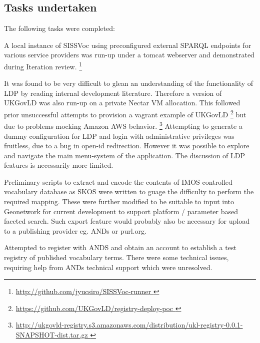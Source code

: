 \documentclass[10pt,a4paper]{article}
\begin{document}
\begin{flushleft}
\clearpage



\section{
  Tasks undertaken
}

%  


  The following tasks were completed:  

  \item[] A local instance of SISSVoc using preconfigured external SPARQL endpoints for various service providers was run-up 
  under a tomcat webserver and demonstrated during Iteration review.
  \footnote{ \url { http://github.com/jyucsiro/SISSVoc-runner }  } 

  \item[] It was found to be very difficult to glean an understanding of the functionality of LDP by reading internal 
  development literature. Therefore a version of UKGovLD was also run-up on a private Nectar VM allocation. This followed prior 
  unsuccessful attempts to provision a vagrant example of UKGovLD 
  \footnote{ \url { https://github.com/UKGovLD/registry-deploy-poc } } but
  due to problems mocking Amazon AWS behavior.  
  \footnote{ \url { 
  http://ukgovld-registry.s3.amazonaws.com/distribution/ukl-registry-0.0.1-SNAPSHOT-dist.tar.gz
  }}
%
  Attempting to generate a dummy configuration for LDP and login with administrative 
	privileges was fruitless, due to a bug in open-id redirection. However it was possible to explore and navigate the main 
  menu-system of the application.
%
  The discussion of LDP features is necessarily more limited.

  \item[] 
  Preliminary scripts to extract and encode the contents of IMOS
  controlled vocabulary database as SKOS were written to guage the difficulty to perform the required mapping. These were further modified to be suitable 
  to input into Geonetwork for current development to support platform / parameter based faceted search. Such export feature would probably also be necessary for upload 
  to a publishing provider eg. ANDs or purl.org. 

  \item[] 
	Attempted to register with ANDS and obtain an account to establish a test
	registry of published vocabulary terms. There were some technical issues, requiring help from ANDs technical
	support which were unresolved.
		

\end{flushleft}
\end{document}
